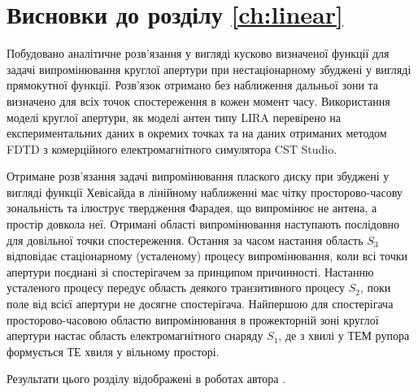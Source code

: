 \section*{Висновки до розділу \ref{ch:linear}}

Побудовано аналітичне розв'язання у вигляді кусково визначеної функції для 
задачі випромінювання круглої апертури при нестаціонарному збуджені у 
вигляді прямокутної функції. Розв'язок отримано без наближення дальньої 
зони та визначено для всіх точок спостереження в кожен момент часу. 
Використання моделі круглої апертури, як моделі антен типу LIRA перевірено 
на експериментальних даних в окремих точках та на даних отриманих методом 
FDTD з комерційного електромагнітного симулятора CST Studio.

Отримане розв'язання задачі випромінювання плаского диску при збуджені у 
вигляді функції Хевісайда в лінійному наближенні має чітку просторово-часову 
зональність та ілюструє твердження Фарадея, що випромінює не антена, а 
простір довкола неї. Отримані області випромінювання наступають послідовно 
для довільної точки спостереження. Остання за часом настання область $ S_3 $ 
відповідає стаціонарному (усталеному) процесу випромінювання, коли всі точки 
апертури поєднані зі спостерігачем за принципом причинності. Настанню 
усталеного процесу передує область деякого транзитивного процесу $ S_2 $, 
поки поле від всієї апертури не досягне спостерігача. Найпершою для 
спостерігача просторово-часовою областю випромінювання в прожекторній зоні 
круглої апертури настає область електромагнітного снаряду $ S_1 $, де з 
хвилі у ТЕМ рупора формується ТЕ хвиля у вільному просторі.




Результати цього розділу відображені в роботах автора 
\cite{my:Telecom2018, my:UKRCON2017, my:UWBUSIS2018, my:UKRCON2019}.
